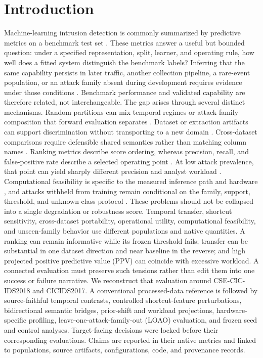 \documentclass[preprint,12pt]{elsarticle}
\begin{document}
\section{Introduction}
Machine-learning intrusion detection is commonly summarized by predictive metrics on a benchmark test set \cite{ring2019survey, sommer2010closed}. These metrics answer a useful but bounded question: under a specified representation, split, learner, and operating rule, how well does a fitted system distinguish the benchmark labels? Inferring that the same capability persists in later traffic, another collection pipeline, a rare-event population, or an attack family absent during development requires evidence under those conditions \cite{arp2022dos}. Benchmark performance and validated capability are therefore related, not interchangeable.
The gap arises through several distinct mechanisms. Random partitions can mix temporal regimes or attack-family composition that forward evaluation separates \cite{pendlebury2019tesseract, arp2022dos}. Dataset or extraction artifacts can support discrimination without transporting to a new domain \cite{engelen2021troubleshooting}. Cross-dataset comparisons require defensible shared semantics rather than matching column names \cite{dhooge2020interdataset, layeghy2023crossdomain}. Ranking metrics describe score ordering, whereas precision, recall, and false-positive rate describe a selected operating point \cite{saito2015precision}. At low attack prevalence, that point can yield sharply different precision and analyst workload \cite{axelsson2000baserate, layman2023falsealarms}. Computational feasibility is specific to the measured inference path and hardware \cite{mattson2020mlperf}, and attacks withheld from training remain conditional on the family, support, threshold, and unknown-class protocol \cite{zoppi2023unknown, shin2023openset}.
These problems should not be collapsed into a single degradation or robustness score. Temporal transfer, shortcut sensitivity, cross-dataset portability, operational utility, computational feasibility, and unseen-family behavior use different populations and native quantities. A ranking can remain informative while its frozen threshold fails; transfer can be substantial in one dataset direction and near baseline in the reverse; and high projected positive predictive value (PPV) can coincide with excessive workload. A connected evaluation must preserve such tensions rather than edit them into one success or failure narrative.
We reconstruct that evaluation around CSE-CIC-IDS2018 and CICIDS2017. A conventional processed-data reference is followed by source-faithful temporal contrasts, controlled shortcut-feature perturbations, bidirectional semantic bridges, prior-shift and workload projections, hardware-specific profiling, leave-one-attack-family-out (LOAO) evaluation, and frozen seed and control analyses. Target-facing decisions were locked before their corresponding evaluations. Claims are reported in their native metrics and linked to populations, source artifacts, configurations, code, and provenance records.
\end{document}
